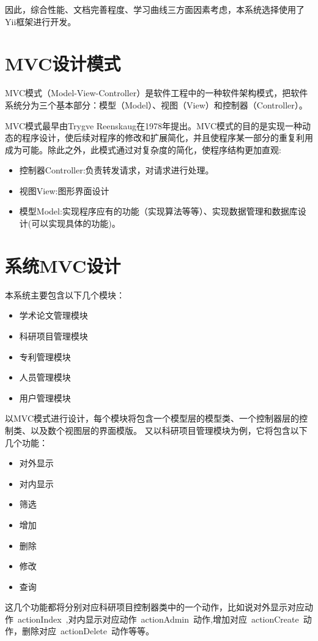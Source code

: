 因此，综合性能\cite{yiiperf}、文档完善程度\cite{makarov2011yii}、学习曲线三方面因素考虑，本系统选择使用了Yii框架进行开发。

\section{MVC设计模式}
MVC模式（Model-View-Controller）是软件工程中的一种软件架构模式，把软件系统分为三个基本部分：模型（Model）、视图（View）和控制器（Controller）。

MVC模式最早由Trygve Reenskaug在1978年提出。MVC模式的目的是实现一种动态的程序设计，使后续对程序的修改和扩展简化，并且使程序某一部分的重复利用成为可能。除此之外，此模式通过对复杂度的简化，使程序结构更加直观:
\begin{itemize}
\item 控制器Controller:负责转发请求，对请求进行处理。
\item 视图View:图形界面设计
\item 模型Model:实现程序应有的功能（实现算法等等）、实现数据管理和数据库设计(可以实现具体的功能)。
\end{itemize}


\section{系统MVC设计}
本系统主要包含以下几个模块：
\begin{itemize}
\item 学术论文管理模块
\item 科研项目管理模块
\item 专利管理模块
\item 人员管理模块
\item 用户管理模块
\end{itemize}

以MVC模式进行设计，每个模块将包含一个模型层的模型类、一个控制器层的控制类、以及数个视图层的界面模版。
又以科研项目管理模块为例，它将包含以下几个功能：

\begin{itemize}
\item 对外显示
\item 对内显示
\item 筛选
\item 增加
\item 删除
\item 修改
\item 查询
\end{itemize}
这几个功能都将分别对应科研项目控制器类中的一个动作，比如说对外显示对应动作~actionIndex~,对内显示对应动作~actionAdmin~动作,增加对应~actionCreate~动作，删除对应~actionDelete~动作等等。

